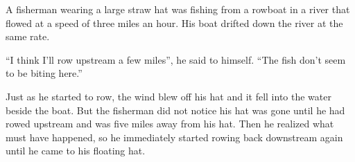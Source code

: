 \documentclass[letterpaper]{exam}
\begin{document}
\begin{questions}








  \question{}
  A fisherman wearing a large straw hat was fishing from a rowboat in a river
  that flowed at a speed of three miles an hour.  His boat drifted down the
  river at the same rate.

  ``I think I'll row upstream a few miles'', he said to himself.  ``The fish
  don't seem to be biting here.''

  Just as he started to row, the wind blew off his hat and it fell into the
  water beside the boat.  But the fisherman did not notice his hat was gone
  until he had rowed upstream and was five miles away from his hat.  Then he
  realized what must have happened, so he immediately started rowing back
  downstream again until he came to his floating hat.


\end{questions}
\end{document}
